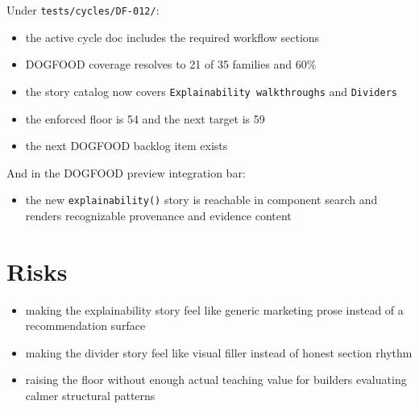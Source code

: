 Under \texttt{t\allowbreak{}e\allowbreak{}s\allowbreak{}t\allowbreak{}s\allowbreak{}/\allowbreak{}c\allowbreak{}y\allowbreak{}c\allowbreak{}l\allowbreak{}e\allowbreak{}s\allowbreak{}/\allowbreak{}D\allowbreak{}F\allowbreak{}-\allowbreak{}0\allowbreak{}1\allowbreak{}2\allowbreak{}/}:

\begin{itemize}
\tightlist
\item
  the active cycle doc includes the required workflow sections
\item
  DOGFOOD coverage resolves to 21 of 35 families and 60\%
\item
  the story catalog now covers \texttt{E\allowbreak{}x\allowbreak{}p\allowbreak{}l\allowbreak{}a\allowbreak{}i\allowbreak{}n\allowbreak{}a\allowbreak{}b\allowbreak{}i\allowbreak{}l\allowbreak{}i\allowbreak{}t\allowbreak{}y\allowbreak{} \allowbreak{}w\allowbreak{}a\allowbreak{}l\allowbreak{}k\allowbreak{}t\allowbreak{}h\allowbreak{}r\allowbreak{}o\allowbreak{}u\allowbreak{}g\allowbreak{}h\allowbreak{}s} and \texttt{D\allowbreak{}i\allowbreak{}v\allowbreak{}i\allowbreak{}d\allowbreak{}e\allowbreak{}r\allowbreak{}s}
\item
  the enforced floor is 54 and the next target is 59
\item
  the next DOGFOOD backlog item exists
\end{itemize}

And in the DOGFOOD preview integration bar:

\begin{itemize}
\tightlist
\item
  the new \texttt{e\allowbreak{}x\allowbreak{}p\allowbreak{}l\allowbreak{}a\allowbreak{}i\allowbreak{}n\allowbreak{}a\allowbreak{}b\allowbreak{}i\allowbreak{}l\allowbreak{}i\allowbreak{}t\allowbreak{}y\allowbreak{}(\allowbreak{})} story is reachable in component search and renders recognizable provenance and evidence content
\end{itemize}

\section{Risks}\label{record-074-risks}

\begin{itemize}
\tightlist
\item
  making the explainability story feel like generic marketing prose instead of a recommendation surface
\item
  making the divider story feel like visual filler instead of honest section rhythm
\item
  raising the floor without enough actual teaching value for builders evaluating calmer structural patterns
\end{itemize}

